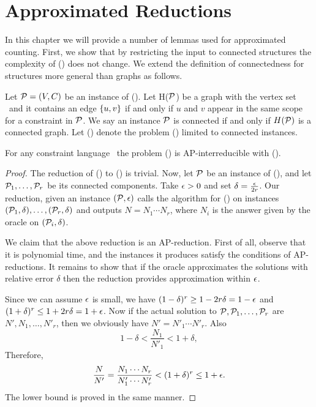 \chapter{Approximated Reductions}
In this chapter we will provide a number of lemmas used for approximated counting. 
First, we show that by restricting the input to connected structures the complexity of 
\ccsp(\mrelset) does not change. We extend the definition of connectedness for structures more general 
than graphs as follows.

Let \(\mathcal{P} = (V, C)\) be an instance of \ccsp(\mrelset)\@. Let H(\(\mathcal{P}\)) be a graph
with the vertex set \mV\ and it contains an edge \(\{{u,v}\}\) if and only if 
\(u\) and \(v\) appear in the same scope for a constraint in \(\mathcal{P}\)\@.
We say an instance \(\mathcal{P}\) is connected if and only if \(H(\mathcal{P})\) is a connected graph.
Let \cccsp(\mrelset) denote the problem \ccsp(\mrelset) limited to connected instances.

\begin{lemma} \label{lemma:connected}
For any constraint language \mrelset\ the problem \ccsp(\mrelset) is AP-interreducible with
\cccsp(\mrelset)\@.
\end{lemma}

\begin{proof}
The reduction of \cccsp(\mrelset) to \ccsp(\mrelset) is trivial. Now, let \(\mathcal{P}\) be an instance of
\ccsp(\mrelset), and let \(\mathcal{P}_1,\dotsc,\mathcal{P}_r\) be its connected components. Take \(\epsilon > 0\) 
and set \(\delta = \frac{\epsilon}{2r}\)\@. Our reduction, given an instance \((\mathcal{P},\epsilon)\) calls
the algorithm for \cccsp(\mrelset) on instances \((\mathcal{P}_1,\delta), \dotsc,(\mathcal{P}_r,\delta)\) 
and outputs \(N = N_1 \dotsm N_r\),
where \(N_i\) is the answer given by the oracle on \((\mathcal{P}_i,\delta)\)\@.

We claim that the above reduction is an AP-reduction. First of all, observe that it is polynomial
time, and the instances it produces satisfy the conditions of AP-reductions. It remains to show
that if the oracle approximates the solutions with relative error \(\delta\) then the reduction 
provides approximation within \(\epsilon\)\@.

Since we can assume \(\epsilon\) is small, we have \((1 - \delta)^r \ge 1 - 2r\delta = 1 - \epsilon \) and
\( ( 1 + \delta)^r \le 1 + 2r\delta = 1 + \epsilon\)\@. Now if 
the actual solution to \(\mathcal{P}, \mathcal{P}_1,\dotsc,\mathcal{P}_r\) are \(N',N_1,\dotsc,N'_r\), then 
we obviously have \(N'=N'_1\dotsm N'_r\)\@. Also
\[1-\delta < \frac{N_1}{N'_1} < 1 + \delta,\]
Therefore,
\[\frac{N}{N'} = \frac{N_1 \dotsm N_r}{N'_1\dotsm N'_r} < (1 + \delta)^r \le 1 + \epsilon.\]
The lower bound is proved in the same manner.
\end{proof}

